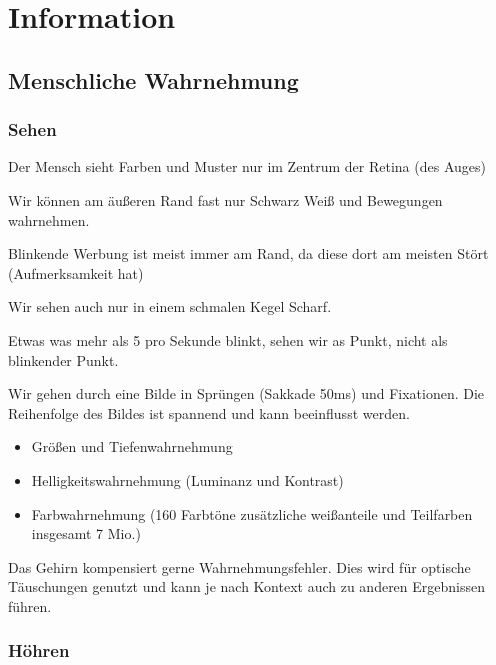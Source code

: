 \documentclass[a4paper]{article}
\title{\docTitle}
\author{Moritz}
\date{\today}
\begin{document}
\maketitle
\tableofcontents


\section{Information}

\subsection{Menschliche Wahrnehmung}

\subsubsection{Sehen}

Der Mensch sieht Farben und Muster nur im Zentrum der Retina (des Auges)

Wir können am äußeren Rand fast nur Schwarz Weiß und Bewegungen wahrnehmen.

Blinkende Werbung ist meist immer am Rand, da diese dort am meisten Stört (Aufmerksamkeit hat)

Wir sehen auch nur in einem schmalen Kegel Scharf.

Etwas was mehr als 5 pro Sekunde blinkt, sehen wir as Punkt, nicht als blinkender Punkt.

Wir gehen durch eine Bilde in Sprüngen (Sakkade 50ms) und Fixationen. Die Reihenfolge des Bildes ist spannend und kann beeinflusst werden.

\begin{itemize}
    \item Größen und Tiefenwahrnehmung
    \item Helligkeitswahrnehmung (Luminanz und Kontrast)
    \item Farbwahrnehmung (160 Farbtöne zusätzliche weißanteile und Teilfarben insgesamt 7 Mio.)
\end{itemize}

Das Gehirn kompensiert gerne Wahrnehmungsfehler. Dies wird für optische Täuschungen genutzt und kann je nach Kontext auch zu anderen Ergebnissen führen.

\subsubsection{Höhren}
\end{document}

